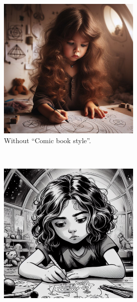 \documentclass[a4paper,11pt]{article}
\begin{document}
\begin{figure}
    \centering
    \begin{subfigure}{0.353\textwidth}
        \begin{subfigure}{1\textwidth}
            \includegraphics[width=\textwidth]{figures/prompt-1.jpeg}
            \caption{Without ``Comic book style''.}
        \end{subfigure}\\
        \begin{subfigure}{1\textwidth}
            \includegraphics[width=\textwidth]{figures/prompt-2.jpeg}

\end{subfigure}
\end{subfigure}
\end{figure}
\end{document}
